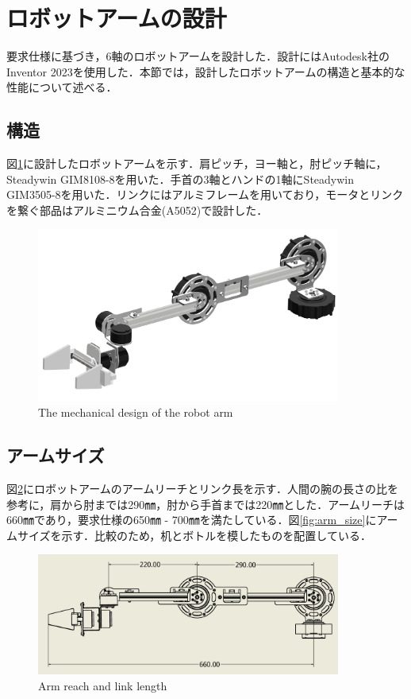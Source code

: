 
\section{ロボットアームの設計}
要求仕様に基づき，6軸のロボットアームを設計した．設計にはAutodesk社のInventor 2023を使用した．本節では，設計したロボットアームの構造と基本的な性能について述べる．
\subsection{構造}
図\ref{fig:arm_design}に設計したロボットアームを示す．肩ピッチ，ヨー軸と，肘ピッチ軸に，Steadywin GIM8108-8を用いた．手首の3軸とハンドの1軸にSteadywin GIM3505-8を用いた．リンクにはアルミフレームを用いており，モータとリンクを繋ぐ部品はアルミニウム合金(A5052)で設計した．
\begin{figure}
  \centering
  \includegraphics[width=10cm]{images/design/arm_design.png}
  \caption{The mechanical design of the robot arm}
  \label{fig:arm_design}
\end{figure}
\subsection{アームサイズ}
図\ref{fig:link_length}にロボットアームのアームリーチとリンク長を示す．人間の腕の長さの比\cite{humanarm:online}を参考に，肩から肘までは290㎜，肘から手首までは220㎜とした．アームリーチは660㎜であり，要求仕様の650㎜ - 700㎜を満たしている．図\ref{fig:arm_size}にアームサイズを示す．比較のため，机とボトルを模したものを配置している．

\begin{figure}[htbp]
  \centering
  \includegraphics[width=10cm]{images/design/link_length.png}
  \caption{Arm reach and link length}
  \label{fig:link_length}
\end{figure}

